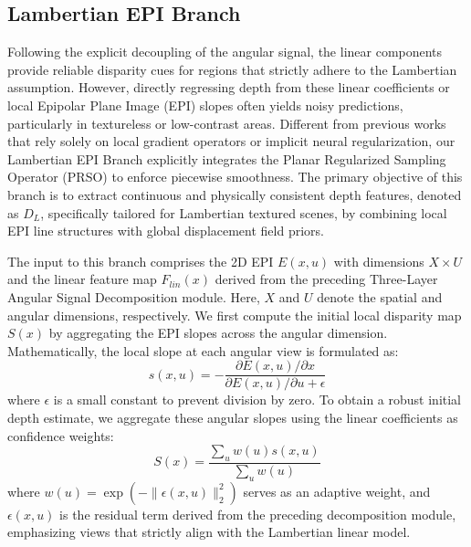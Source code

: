 \documentclass[lettersize,journal]{IEEEtran}
\begin{document}
\subsection{Lambertian EPI Branch}

Following the explicit decoupling of the angular signal, the linear components provide reliable disparity cues for regions that strictly adhere to the Lambertian assumption. However, directly regressing depth from these linear coefficients or local Epipolar Plane Image (EPI) slopes often yields noisy predictions, particularly in textureless or low-contrast areas. Different from previous works that rely solely on local gradient operators or implicit neural regularization, our Lambertian EPI Branch explicitly integrates the Planar Regularized Sampling Operator (PRSO) to enforce piecewise smoothness. The primary objective of this branch is to extract continuous and physically consistent depth features, denoted as $D_L$, specifically tailored for Lambertian textured scenes, by combining local EPI line structures with global displacement field priors.

The input to this branch comprises the 2D EPI $E(x, u)$ with dimensions $X \times U$ and the linear feature map $F_{lin}(x)$ derived from the preceding Three-Layer Angular Signal Decomposition module. Here, $X$ and $U$ denote the spatial and angular dimensions, respectively. We first compute the initial local disparity map $S(x)$ by aggregating the EPI slopes across the angular dimension. Mathematically, the local slope at each angular view is formulated as:
\begin{equation}
s(x, u) = -\frac{\partial E(x, u) / \partial x}{\partial E(x, u) / \partial u + \epsilon}
\label{eq:ch3_8}
\end{equation}
where $\epsilon$ is a small constant to prevent division by zero. To obtain a robust initial depth estimate, we aggregate these angular slopes using the linear coefficients as confidence weights:
\begin{equation}
S(x) = \frac{\sum_{u} w(u) s(x, u)}{\sum_{u} w(u)}
\label{eq:ch3_9}
\end{equation}
where $w(u) = \exp(-\| \epsilon(x, u) \|_2^2)$ serves as an adaptive weight, and $\epsilon(x, u)$ is the residual term derived from the preceding decomposition module, emphasizing views that strictly align with the Lambertian linear model.
\end{document}
